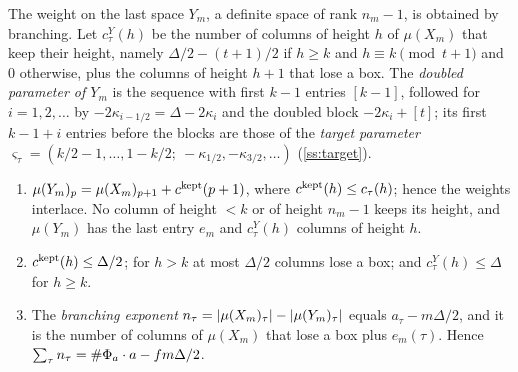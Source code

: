 The weight on the last space $Y_m$, a definite space of rank $n_m-1$, is obtained by branching. Let
$c^Y_\tau(h)$ be the number of columns of height $h$ of $\mu(X_m)$ that keep their height, namely
$\Delta/2-(t+1)/2$ if $h\ge k$ and $h\equiv k\pmod{t+1}$ and $0$ otherwise, plus the columns of height
$h+1$ that lose a box. The \emph{doubled parameter of $Y_m$} is the sequence with first $k-1$ entries
$[k-1]$, followed for $i=1,2,\dots$ by $-2\kappa_{i-1/2}=\Delta-2\kappa_i$ and the doubled block
$-2\kappa_i+[t]$; its first $k-1+i$ entries before the blocks are those of the \emph{target parameter}
$\varsigma_\tau=(k/2-1,\dots,1-k/2;\ -\kappa_{1/2},-\kappa_{3/2},\dots)$ (\cref{ss:target}).

\begin{proposition}\label{prop:weight-Y}
\begin{enumerate}[label=\textup{(\alph*)}]
\item $\mu(Y_m)_p=\mu(X_m)_{p+1}+c^{\rm kept}(p+1)$, where $c^{\rm kept}(h)\le c_\tau(h)$; hence the
weights interlace. No column of height $<k$ or of height $n_m-1$ keeps its height, and
$\mu(Y_m)$ has the last entry $e_m$ and $c^Y_\tau(h)$ columns of height $h$.
\item $c^{\rm kept}(h)\le\Delta/2$; for $h>k$ at most $\Delta/2$ columns lose a box; and
$c^Y_\tau(h)\le\Delta$ for $h\ge k$.
\item The \emph{branching exponent} $n_\tau=\lvert \mu(X_m)_\tau\rvert-\lvert \mu(Y_m)_\tau\rvert$ equals
$a_\tau-m\Delta/2$, and it is the number of columns of $\mu(X_m)$ that lose a box plus $e_m(\tau)$.
Hence $\sum_\tau n_\tau=\#\Phi_a\cdot a-fm\Delta/2$.
\end{enumerate}
\end{proposition}

